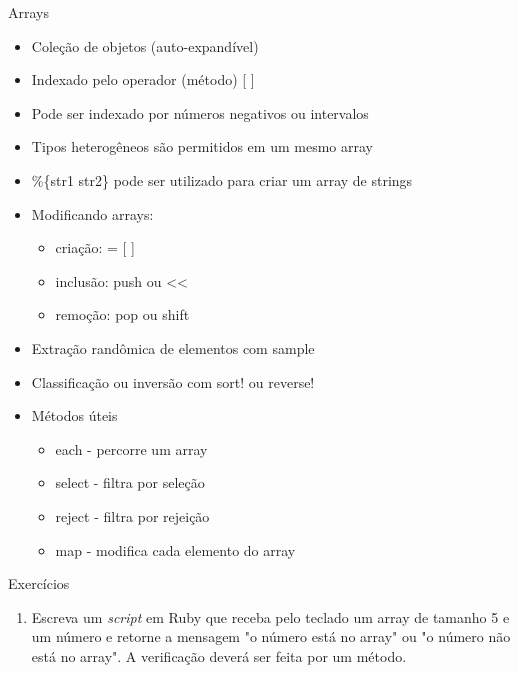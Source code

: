 
\begin{frame}{Arrays}
  \begin{itemize}
    \item Coleção de objetos (auto-expandível)
    \item Indexado pelo operador (método) \alert{[ ]}
    \item Pode ser indexado por números negativos ou intervalos
    \item Tipos heterogêneos são permitidos em um mesmo array
    \item \%\{str1 str2\} pode ser utilizado para criar um array de strings
  \end{itemize}
  
  
\pagebreak
  \begin{itemize}
    \item Modificando arrays:
    \begin{itemize}
      \item criação: \alert{= [ ]}
      \item inclusão: \alert{push} ou {<<}
      \item remoção: \alert{pop} ou {shift}
    \end{itemize}
    \item Extração randômica de elementos com \alert{sample}
    \item Classificação ou inversão com \alert{sort!} ou {reverse!}
  \end{itemize}  
  
  
  
\pagebreak
  \begin{itemize}
    \item Métodos úteis
    \begin{itemize}
      \item \alert{each} - percorre um array
      \item \alert{select} - filtra por seleção
      \item \alert{reject} - filtra por rejeição
      \item \alert{map} - modifica cada elemento do array
    \end{itemize}
  \end{itemize}  
  
  

\end{frame}
\begin{frame}{Exercícios}
  \begin{enumerate}
    \item Escreva um \textit{script} em Ruby que receba pelo teclado um array de tamanho 5 e um número e retorne a mensagem "o número está no array" ou "o número não está no array".  A verificação deverá ser feita por um método.
  \end{enumerate}
\end{frame}

